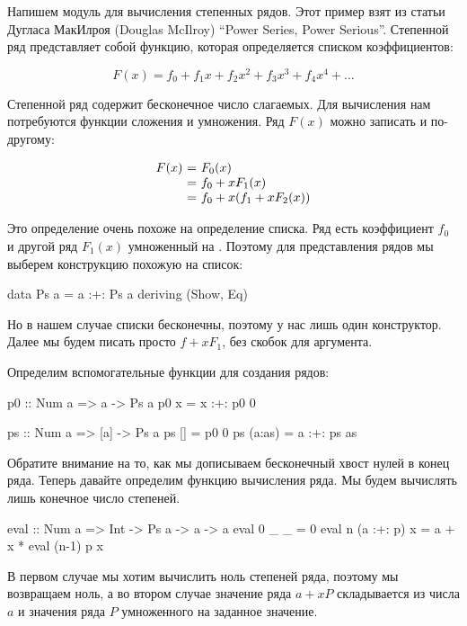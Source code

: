 Напишем модуль для вычисления степенных рядов. Этот пример взят из
статьи Дугласа МакИлроя (Douglas McIlroy) ``Power Series, Power
Serious''. Степенной ряд представляет собой функцию, которая
определяется списком коэффициентов:

\[F(x) = f_0 + f_1 x + f_2 x^2 + f_3 x^3 + f_4 x^4 + ...\]

Степенной ряд содержит бесконечное число слагаемых. Для вычисления нам
потребуются функции сложения и умножения. Ряд $F(x)$ можно записать и
по-другому:

\[\begin{array}{l@{\ =\ }l}
F(x) & F_0 (x) \\
     & f_0 + x F_1 (x)  \\
     & f_0 + x (f_1 + x F_2 (x)) \\   
\end{array}\]

Это определение очень похоже на определение списка. Ряд есть коэффициент
$f_0$ и другой ряд $F_1(x)$ умноженный на . Поэтому для
представления рядов мы выберем конструкцию похожую на список:


\begin{code}
data Ps a = a :+: Ps a
    deriving (Show, Eq)
\end{code}

Но в нашем случае списки бесконечны, поэтому у нас лишь один
конструктор. Далее мы будем писать просто $f + x F_1$, без скобок для
аргумента.

Определим вспомогательные функции для создания рядов:


\begin{code}
p0 :: Num a => a -> Ps a
p0 x = x :+: p0 0

ps :: Num a => [a] -> Ps a
ps []     = p0 0
ps (a:as) = a :+: ps as
\end{code}

Обратите внимание на то, как мы дописываем бесконечный хвост нулей в
конец ряда. Теперь давайте определим функцию вычисления ряда. Мы будем
вычислять лишь конечное число степеней.


\begin{code}
eval :: Num a => Int -> Ps a -> a -> a
eval 0 _         _ = 0
eval n (a :+: p) x = a + x * eval (n-1) p x
\end{code}

В первом случае мы хотим вычислить ноль степеней ряда, поэтому мы
возвращаем ноль, а во втором случае значение ряда $a + x P$ складывается
из числа $a$ и значения ряда $P$ умноженного на заданное значение.

